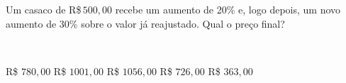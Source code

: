 \parbox{\linewidth}{

Um casaco de R\$\,$500{,}00$ recebe um aumento de 20\% e, logo depois, um novo aumento de 30\% sobre o valor já reajustado. Qual o preço final?}
\vspace{2mm}
\\\parbox{\linewidth}{

R\$ $780{,}00$
R\$ $1001{,}00$
R\$ $1056{,}00$
R\$ $726{,}00$
R\$ $363{,}00$

}


